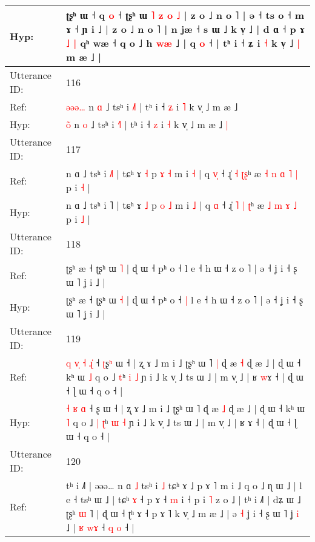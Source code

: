 \documentclass[10pt]{article}
\DeclareRobustCommand{\hl}[1]{{\textcolor{red}{#1}}}
\begin{document}
\begin{longtable}{ll}
 \\
Hyp: & ʈʂʰ ɯ ˧\hl{}\hl{} q\hl{}\hl{}\hl{}\hl{}\hl{} \hl{}\hl{o} ˧ ʈʂʰ ɯ \hl{˥} \hl{z} \hl{o} \hl{˩} | z o ˩ n o ˥ | ə ˧ ts o ˧ m ɤ ˧ ɲ i ˩ | z o ˩ n o ˥ | n jæ ˧ s ɯ ˩ k v̩ ˩ | d ɑ ˧ p ɤ\hl{ }\hl{˩} \hl{|} qʰ wæ ˧ q o ˩ h\hl{}\hl{}\hl{}\hl{}\hl{} \hl{}\hl{w}\hl{æ} ˩ | q\hl{}\hl{}\hl{}\hl{}\hl{} \hl{}\hl{o} ˧ | tʰ i ˧ ʑ i \hl{˧} k v̩ ˩\hl{ }\hl{|} m æ ˩ |
 \\
\midrule
Utterance ID: & 116 \\
Ref: & \hl{ə}\hl{ə}\hl{ə}\hl{…} n \hl{ɑ} ˩ tsʰ i \hl{˩}˥ | tʰ i ˧ \hl{ʑ} i \hl{˥} k v̩ ˩ m æ ˩\hl{}\hl{}
 \\
Hyp: & \hl{}\hl{}\hl{o}\hl{̃} n \hl{o} ˩ tsʰ i \hl{˧}˥ | tʰ i ˧ \hl{z} i \hl{˧} k v̩ ˩ m æ ˩\hl{ }\hl{|}
 \\
\midrule
Utterance ID: & 117 \\
Ref: & n ɑ ˩ tsʰ i \hl{˩}˥ | tɕʰ ɤ \hl{˧} p \hl{ɤ} \hl{˧} m i \hl{˧} | q \hl{v}\hl{̩} ˧ ɻ̍ \hl{˧} \hl{}\hl{ʈ}\hl{ʂ}ʰ æ\hl{ }\hl{˧} \hl{n} \hl{ɑ} \hl{˥} \hl{|} p i \hl{˧} |
 \\
Hyp: & n ɑ ˩ tsʰ i \hl{}˥ | tɕʰ ɤ \hl{˩} p \hl{o} \hl{˩} m i \hl{˩} | q \hl{}\hl{ɑ} ˧ ɻ̍ \hl{˥} \hl{|}\hl{ }\hl{ʈ}ʰ æ\hl{}\hl{} \hl{˩} \hl{m} \hl{ɤ} \hl{˩} p i \hl{˩} |
 \\
\midrule
Utterance ID: & 118 \\
Ref: & ʈʂʰ æ ˧ ʈʂʰ ɯ \hl{˥} | ɖ ɯ ˧ pʰ o ˧\hl{}\hl{} l e ˧ h ɯ ˧ z o ˥ | ə ˧ ʝ i ˧ ʂ ɯ ˥ ʝ i ˩ |
 \\
Hyp: & ʈʂʰ æ ˧ ʈʂʰ ɯ \hl{˧} | ɖ ɯ ˧ pʰ o ˧\hl{ }\hl{|} l e ˧ h ɯ ˧ z o ˥ | ə ˧ ʝ i ˧ ʂ ɯ ˥ ʝ i ˩ |
 \\
\midrule
Utterance ID: & 119 \\
Ref: & \hl{q}\hl{ }\hl{v}\hl{̩} \hl{˧} \hl{ɻ}\hl{̍} ˧ \hl{ʈ}ʂ\hl{ʰ} ɯ ˧ | ʐ ɤ ˩ m i ˩ ʈʂʰ ɯ ˥\hl{ }\hl{|} ɖ æ \hl{˧} ɖ æ ˩ | ɖ ɯ ˧ kʰ ɯ \hl{˩} q o ˩\hl{}\hl{} \hl{t}ʰ \hl{i} \hl{˩} ɲ i ˩ k v̩ ˩ ts ɯ ˩ | m v̩ ˩ | ʁ \hl{w}ɤ ˧ | ɖ ɯ ˧ ɭ ɯ ˧ q o ˧ |
 \\
Hyp: & \hl{}\hl{}\hl{}\hl{˧} \hl{ʁ} \hl{}\hl{ɑ} ˧ \hl{}ʂ\hl{} ɯ ˧ | ʐ ɤ ˩ m i ˩ ʈʂʰ ɯ ˥\hl{}\hl{} ɖ æ \hl{˩} ɖ æ ˩ | ɖ ɯ ˧ kʰ ɯ \hl{˥} q o ˩\hl{ }\hl{|} \hl{ʈ}ʰ \hl{ɯ} \hl{˧} ɲ i ˩ k v̩ ˩ ts ɯ ˩ | m v̩ ˩ | ʁ \hl{}ɤ ˧ | ɖ ɯ ˧ ɭ ɯ ˧ q o ˧ |
 \\
\midrule
Utterance ID: & 120 \\
Ref: & tʰ i ˩˥ | əəə…\hl{}\hl{}\hl{}\hl{} n ɑ \hl{˩} tsʰ i \hl{˩} tɕʰ ɤ ˩ p ɤ ˥ m i ˩ q o ˩ ɳ ɯ ˩ | l e ˧ tsʰ ɯ ˩ | tɕʰ \hl{ɤ} ˧ p ɤ ˧ \hl{m} i ˧ p i \hl{˥} z o ˩ | tʰ i ˩˥ | dʑ ɯ ˩ ʈʂʰ \hl{ɯ} \hl{}˥ | ɖ ɯ ˧ ʈʰ ɤ ˧ p ɤ ˥ k v̩ ˩ m æ ˩ | ə\hl{ }\hl{˧} ʝ i ˧ ʂ ɯ ˥ ʝ \hl{i} ˩ | \hl{ʁ} \hl{w}\hl{ɤ} ˧ \hl{q} \hl{o} ˧ |

\end{longtable}
\end{document}
